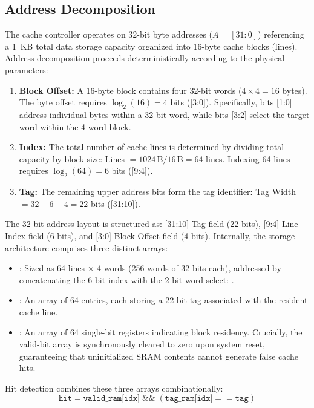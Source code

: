 \documentclass[conference]{IEEEtran}
\newcommand{\sig}[1]{\texttt{\detokenize{#1}}}
\begin{document}
\subsection{Address Decomposition}
The cache controller operates on 32-bit byte addresses ($A = [31{:}0]$) referencing a 1~KB total data storage capacity organized into 16-byte cache blocks (lines). Address decomposition proceeds deterministically according to the physical parameters:
\begin{enumerate}
\item \textbf{Block Offset:} A 16-byte block contains four 32-bit words ($4 \times 4 = 16$ bytes). The byte offset requires $\log_2(16) = 4$ bits ([3:0]). Specifically, bits [1:0] address individual bytes within a 32-bit word, while bits [3:2] select the target word within the 4-word block.
\item \textbf{Index:} The total number of cache lines is determined by dividing total capacity by block size: Lines $= 1024\,\text{B} / 16\,\text{B} = 64$ lines. Indexing 64 lines requires $\log_2(64) = 6$ bits ([9:4]).
\item \textbf{Tag:} The remaining upper address bits form the tag identifier: Tag Width $= 32 - 6 - 4 = 22$ bits ([31:10]).
\end{enumerate}
The 32-bit address layout is structured as: [31:10] Tag field (22 bits), [9:4] Line Index field (6 bits), and [3:0] Block Offset field (4 bits). Internally, the storage architecture comprises three distinct arrays:
\begin{itemize}
\item \sig{data_ram}: Sized as 64 lines $\times$ 4 words (256 words of 32 bits each), addressed by concatenating the 6-bit index with the 2-bit word select: \sig{{idx, word_sel}}.
\item \sig{tag_ram}: An array of 64 entries, each storing a 22-bit tag associated with the resident cache line.
\item \sig{valid_ram}: An array of 64 single-bit registers indicating block residency. Crucially, the valid-bit array is synchronously cleared to zero upon system reset, guaranteeing that uninitialized SRAM contents cannot generate false cache hits.
\end{itemize}
Hit detection combines these three arrays combinationally:
\begin{equation*}
\texttt{hit} = \texttt{valid\_ram[idx]} \;\&\&\; (\texttt{tag\_ram[idx]} == \texttt{tag})
\end{equation*}
\end{document}
